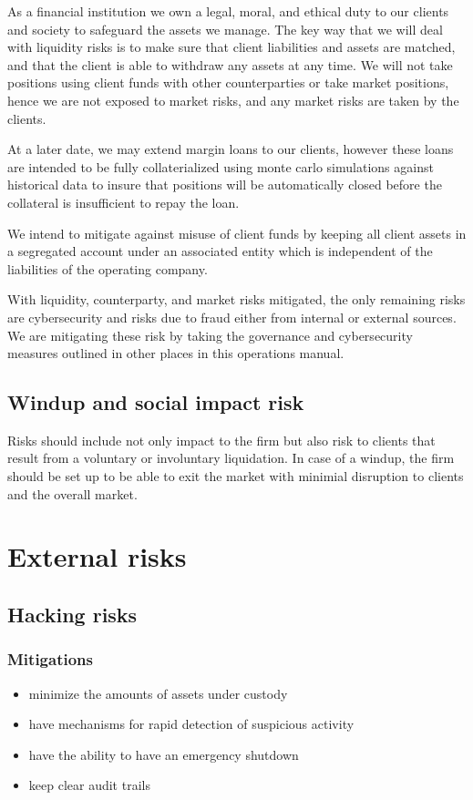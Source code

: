 As a financial institution we own a legal, moral, and ethical duty to
our clients and society to safeguard the assets we manage.  The key
way that we will deal with liquidity risks is to make sure that client
liabilities and assets are matched, and that the client is able to
withdraw any assets at any time.  We will not take positions using
client funds with other counterparties or take market positions, hence
we are not exposed to market risks, and any market risks are taken by
the clients.

At a later date, we may extend margin loans to our clients, however
these loans are intended to be fully collaterialized using monte carlo
simulations against historical data to insure that positions will be
automatically closed before the collateral is insufficient to repay
the loan.

We intend to mitigate against misuse of client funds by keeping all
client assets in a segregated account under an associated entity which
is independent of the liabilities of the operating company.

With liquidity, counterparty, and market risks mitigated, the only
remaining risks are cybersecurity and risks due to fraud either from
internal or external sources.  We are mitigating these risk by taking
the governance and cybersecurity measures outlined in other places in
this operations manual.


\subsection{Windup and social impact risk}
Risks should include not only impact to the firm but also risk to
clients that result from a voluntary or involuntary liquidation.  In
case of a windup, the firm should be set up to be able to exit the
market with minimial disruption to clients and the overall market.

\section{External risks}

\subsection{Hacking risks}
\subsubsection{Mitigations}
\begin{itemize}
\item minimize the amounts of assets under custody
\item have mechanisms for rapid detection of suspicious activity
\item have the ability to have an emergency shutdown
  \item keep clear audit trails
\end{itemize}

